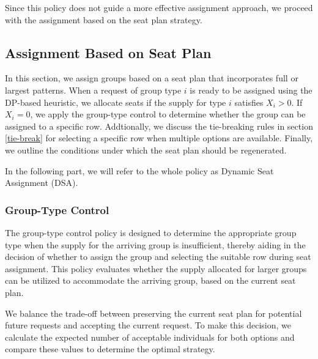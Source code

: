 Since this policy does not guide a more effective assignment approach, we proceed with the assignment based on the seat plan strategy.

\subsection{Assignment Based on Seat Plan}
In this section, we assign groups based on a seat plan that incorporates full or largest patterns. When a request of group type $i$ is ready to be assigned using the DP-based heuristic, we allocate seats if the supply for type $i$ satisfies $X_{i} > 0$. If $X_{i} = 0$, we apply the group-type control to determine whether the group can be assigned to a specific row. Addtionally, we discuss the tie-breaking rules in section \ref{tie-break} for selecting a specific row when multiple options are available. Finally, we outline the conditions under which the seat plan should be regenerated.

In the following part, we will refer to the whole policy as Dynamic Seat Assignment (DSA).


\subsubsection{Group-Type Control}\label{nested_policy}
The group-type control policy is designed to determine the appropriate group type when the supply for the arriving group is insufficient, thereby aiding in the decision of whether to assign the group and selecting the suitable row during seat assignment. This policy evaluates whether the supply allocated for larger groups can be utilized to accommodate the arriving group, based on the current seat plan.

We balance the trade-off between preserving the current seat plan for potential future requests and accepting the current request. To make this decision, we calculate the expected number of acceptable individuals for both options and compare these values to determine the optimal strategy.


